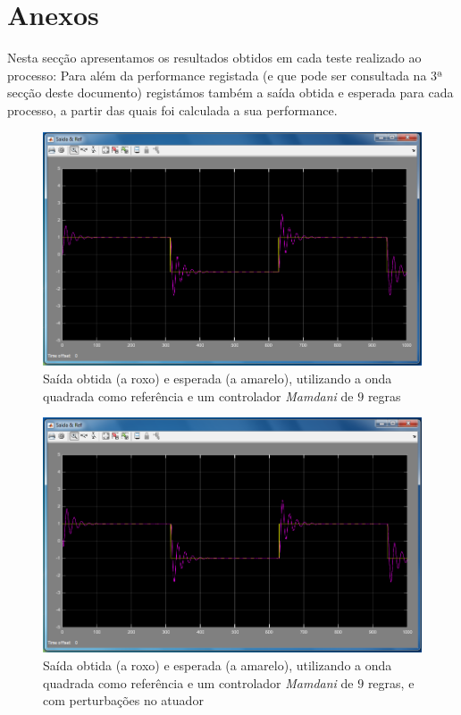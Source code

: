 \documentclass{article}
\begin{document}
\pagebreak

\section{Anexos}

Nesta secção apresentamos os resultados obtidos em cada teste realizado ao processo: Para além da performance registada (e que pode ser consultada na 3ª secção deste documento) registámos também a saída obtida e esperada para cada processo, a partir das quais foi calculada a sua performance.

\vspace{.2cm}


\begin{figure}[h]
  \centering
      \includegraphics[scale=0.3]{Images/Mamdani_9_square.png}
  \caption{Saída obtida (a roxo) e esperada (a amarelo), utilizando a onda quadrada como referência e um controlador \emph{Mamdani} de $9$ regras}
\end{figure}

\begin{figure}[h]
  \centering
      \includegraphics[scale=0.3]{Images/Mamdani_9_square_actuator.png}
  \caption{Saída obtida (a roxo) e esperada (a amarelo), utilizando a onda quadrada como referência e um controlador \emph{Mamdani} de $9$ regras, e com perturbações no atuador}
\end{figure}
\end{document}
